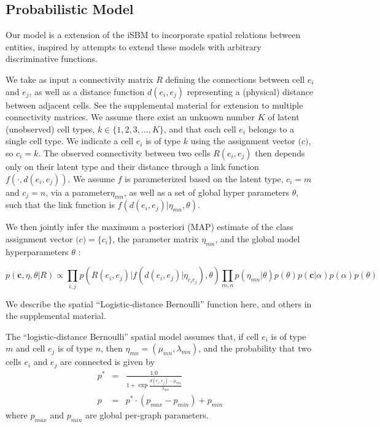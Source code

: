 \documentclass{article}
\renewcommand{\vec}[1]{\mathbf{#1}}
\begin{document}
\subsection*{Probabilistic Model}

Our model is a extension of the iSBM
\autocite{Kemp2006a,Xu2006} to incorporate spatial relations between entities,
inspired by attempts to extend these models with arbitrary
discriminative functions\autocite{Murphy2012}.

We take as input a connectivity matrix $R$ defining the connections
between cell $e_i$ and $e_j$, as well as a distance function $d(e_i,
e_j)$ representing a (physical) distance between adjacent cells. See
the supplemental material for extension to multiple connectivity
matrices. We assume there exist an unknown number $K$ of latent
(unobserved) cell types, $k \in \{1, 2, 3, \dots, K\}$, and that each
cell $e_i$ belongs to a single cell type. We indicate a cell $e_i$ is
of type $k$ using the assignment vector $\vec(c)$, so $c_i = k$. The
observed connectivity between two cells $R(e_i, e_j)$ then depends
only on their latent type and their distance through a link function
$f(\cdot, d(e_i, e_j))$. We assume $f$ is parameterized based on the
latent type, $c_i=m$ and $c_j=n$, via a parameter$\eta_{mn}$, as well
as a set of global hyper parameters $\theta$, such that the link
function is $f(d(e_i, e_j) | \eta_{mn}, \theta)$. 


We then jointly infer the maximum a posteriori (MAP) estimate of the
class assignment vector $\vec(c) = \{c_i\}$, the parameter matrix $\eta_{mn}$, and
the global model hyperparameters $\theta$ :

\begin{equation}
  p(\vec{c}, \eta, \theta | R ) \propto \prod_{i, j} p(R(e_i, e_j) | f(d(e_i, e_j) | \eta_{c_ic_j}), \theta) \prod_{m, n} p(\eta_{mn} | \theta)  p(\theta) p(\vec{c} | \alpha) p(\alpha) p(\theta)
\end{equation}





We describe the spatial ``Logistic-distance Bernoulli''  function here,
and others in the supplemental material. 

The ``logistic-distance Bernoulli'' spatial model assumes that, if cell
$e_i$ is of type $m$ and cell $e_j$ is of type $n$, then $\eta_{mn}
= (\mu_{mn}, \lambda_{mn})$, and the probability that two cells $e_i$
and $e_j$ are connected is given by
\begin{eqnarray}
p^* &=& \frac{1.0}{1 + \exp \frac{d(e_i, e_j) - \mu_{mn}}{\lambda_{mn}}}\\
p &= & p^* \cdot (p_{max} - p_{min}) + p_{min}
\end{eqnarray}
where $p_{max}$ and $p_{min}$ are global per-graph parameters. 
\end{document}
